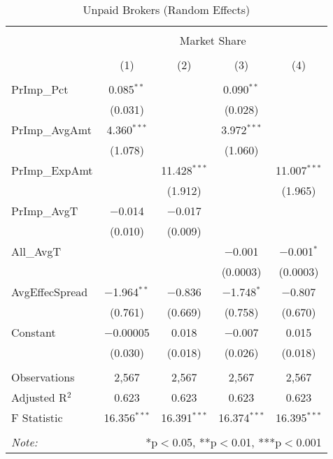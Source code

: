 \documentclass[11pt]{beamer}
\begin{document}
\begin{frame}
\fontsize{6pt}{7}\selectfont

\begin{table}[!htbp] \centering 
	\caption{Unpaid Brokers (Random Effects)} 
	\label{} 
	\begin{tabular}{@{\extracolsep{1em}}lcccc} 
		\\[-1.8ex]\hline 
		\hline \\[-1.8ex] 
		& \multicolumn{4}{c}{Market Share} \\ 
		\cline{2-5} 
		\\[-1.8ex] & (1) & (2) & (3) & (4)\\ 
		\hline \\[-1.8ex] 
		PrImp\_Pct & 0.085$^{**}$ &  & 0.090$^{**}$ &  \\ 
		& (0.031) &  & (0.028) &  \\ 
		PrImp\_AvgAmt & 4.360$^{***}$ &  & 3.972$^{***}$ &  \\ 
		& (1.078) &  & (1.060) &  \\ 
		PrImp\_ExpAmt &  & 11.428$^{***}$ &  & 11.007$^{***}$ \\ 
		&  & (1.912) &  & (1.965) \\ 
		PrImp\_AvgT & $-$0.014 & $-$0.017 &  &  \\ 
		& (0.010) & (0.009) &  &  \\ 
		All\_AvgT &  &  & $-$0.001 & $-$0.001$^{*}$ \\ 
		&  &  & (0.0003) & (0.0003) \\ 
		AvgEffecSpread & $-$1.964$^{**}$ & $-$0.836 & $-$1.748$^{*}$ & $-$0.807 \\ 
		& (0.761) & (0.669) & (0.758) & (0.670) \\ 
		Constant & $-$0.00005 & 0.018 & $-$0.007 & 0.015 \\ 
		& (0.030) & (0.018) & (0.026) & (0.018) \\ 
		\hline \\[-1.8ex] 
		Observations & 2,567 & 2,567 & 2,567 & 2,567 \\ 
		Adjusted R$^{2}$ & 0.623 & 0.623 & 0.623 & 0.623 \\ 
		F Statistic & 16.356$^{***}$  & 16.391$^{***}$  & 16.374$^{***}$  & 16.395$^{***}$  \\ 
		\hline 
		\hline \\[-1.8ex] 
		\textit{Note:}  & \multicolumn{4}{r}{*p$<$0.05, **p$<$0.01, ***p$<$0.001} \\ 
	\end{tabular} 
\end{table} 

\end{frame}
\end{document}
